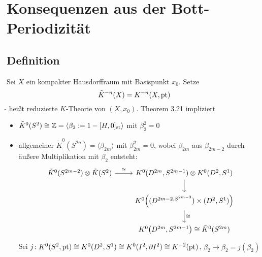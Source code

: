 \section*{Konsequenzen aus der Bott-Periodizität}

\subsection*{Definition} %
\label{sub:definition}
Sei $X$ ein kompakter Hausdorffraum mit Basispunkt $x_0$. Setze
\[
	\tilde{K}^{-n} (X) = K^{-n}(X,\mathrm{pt})
\]
$\tilde{}$ heißt reduzierte $K$-Theorie von $(X,x_0)$. Theorem 3.21 impliziert
\begin{itemize}
	\item $\tilde{K}^0(S^2) \cong \mathbb{Z} =  \langle \beta_2 := 1 - [H,0]_{\mathrm{st}}\rangle$ mit $\beta_2^2=0$
	\item allgemeiner $\tilde{K}^0(S^{2n}) = \langle \beta_{2m}\rangle$ mit $\beta_{2m}^2=0$, wobei $\beta_{2m}$ aus $\beta_{2m-2}$ durch äußere Multiplikation mit $\beta_2$
	entsteht:
	\[ 
		\begin{tikzcd}[]
			\tilde{K}^0(S^{2m-2}) \otimes \tilde{K}(S^2) \rar["\cong"] & K^0(D^{2m}, S^{2m-1}) \otimes K^0(D^2,S^1) \dar \\
			& K^0 \enbrace*{(D^{2m-2, S^{2m-3}}) \times (D^2,S^1)} \dar["\cong"] \\
			& K^0 \enbrace*{D^{2m}, S^{2m-1}} \cong \tilde{K}^0(S^{2m}) 
		\end{tikzcd} 
	\]
	Sei $j \colon K^0(S^2,\mathrm{pt}) \cong K^0(D^2,S^1) \cong K^0(I^2, \partial I^2) \cong K^{-2}(\mathrm{pt})$, $\beta_2 \mapsto \hat{\beta}_2= j(\beta_2)$
\end{itemize}


